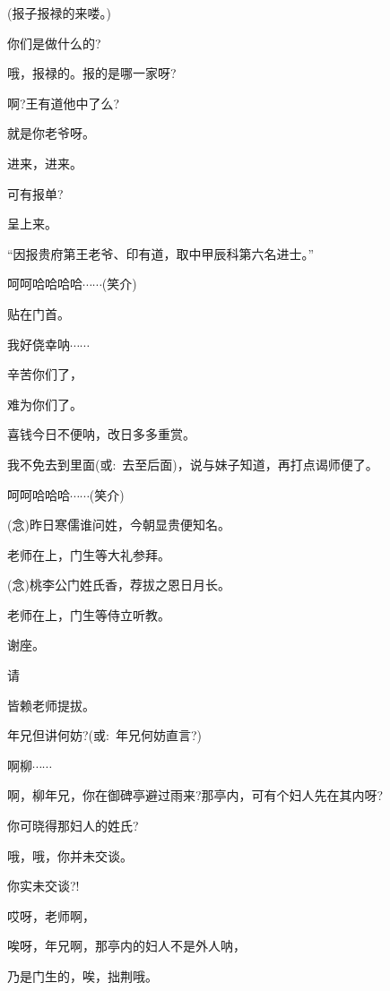 {{(报子\hspace{30pt}报禄的来喽。)}

{你们是做什么的?}

{哦，报禄的。报的是哪一家呀?}

{啊?王有道他中了么?}

{就是你老爷呀。}

{进来，进来。}

{可有报单?}

{呈上来。}

{``因报贵府第王老爷、印有道，取中甲辰科第六名进士。''}

{呵呵哈哈哈哈$\cdots{}\cdots{}$({\hwfs 笑介})}

{贴在门首。}

{我好侥幸{\footnotesize 呐}$\cdots{}\cdots{}$}

{辛苦你们了，}

{难为你们了。}

{喜钱今日不便呐，改日多多重赏。}

{我不免去到里面({\akai 或}:~去至后面)，说与妹子知道，再打点谒师便了。}


{呵呵哈哈哈$\cdots{}\cdots{}$({\hwfs 笑介})}

{\vspace{5pt}}

{({\akai 念})昨日寒儒谁问姓，今朝显贵便知名。}

{老师在上，门生等大礼参拜。}

{({\akai 念})桃李公门姓氏香，荐拔之恩日月长。}

{老师在上，门生等侍立听教。}

{谢座。}

{请}

{皆赖老师提拔。}

{年兄但讲何妨?({\akai 或}:~年兄何妨直言?)}

{啊柳$\cdots{}\cdots{}$}

{啊，柳年兄，你在御碑亭避过雨来?那亭内，可有个妇人先在其内呀?}

{你可晓得那妇人的姓氏?}

{哦，哦，你并未交谈。}

{你实未交谈?!}

{哎呀，老师啊，}

{唉呀，年兄啊，那亭内的妇人不是外人呐，}

{乃是门生的，唉，拙荆哦。}

}
